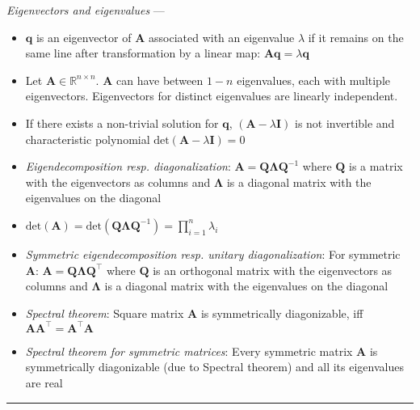 \emph{Eigenvectors and eigenvalues} --- 
\begin{itemize}
    \item $\boldsymbol{q}$ is an eigenvector of $\boldsymbol{A}$ associated with an eigenvalue $\lambda$ if it remains on the same line after transformation by a linear map: $\boldsymbol{A}\boldsymbol{q} = \lambda\boldsymbol{q}$
    \item Let $\boldsymbol{A} \in \mathbb{R}^{n \times n}$. $\boldsymbol{A}$ can have between $1-n$ eigenvalues, each with multiple eigenvectors. Eigenvectors for distinct eigenvalues are linearly independent.
    \item If there exists a non-trivial solution for $\boldsymbol{q}$, $(\boldsymbol{A}-\lambda\boldsymbol{I})$ is not invertible and characteristic polynomial $\textrm{det}(\boldsymbol{A}-\lambda\boldsymbol{I}) = 0$
    \item \emph{Eigendecomposition resp. diagonalization}: $\boldsymbol{A} = \boldsymbol{Q}\boldsymbol{\Lambda}\boldsymbol{Q}^{-1}$ where $\boldsymbol{Q}$ is a matrix with the eigenvectors as columns and $\boldsymbol{\Lambda}$ is a diagonal matrix with the eigenvalues on the diagonal
    \item $\textrm{det}(\boldsymbol{A}) = \textrm{det}(\boldsymbol{Q}\boldsymbol{\Lambda}\boldsymbol{Q}^{-1}) = \prod_{i=1}^n \lambda_i$
    \item \emph{Symmetric eigendecomposition resp. unitary diagonalization}: For symmetric $\boldsymbol{A}$: $\boldsymbol{A} = \boldsymbol{Q}\boldsymbol{\Lambda}\boldsymbol{Q}^\intercal$ where $\boldsymbol{Q}$ is an orthogonal matrix with the eigenvectors as columns and $\boldsymbol{\Lambda}$ is a diagonal matrix with the eigenvalues on the diagonal
    \item \emph{Spectral theorem}: Square matrix $\boldsymbol{A}$ is symmetrically diagonizable, iff $\boldsymbol{A}\boldsymbol{A}^\intercal = \boldsymbol{A}^\intercal\boldsymbol{A}$
    \item \emph{Spectral theorem for symmetric matrices}: Every symmetric matrix $\boldsymbol{A}$ is symmetrically diagonizable (due to Spectral theorem) and all its eigenvalues are real
\end{itemize}

{\color{lightgray}\hrule height 0.001mm}

